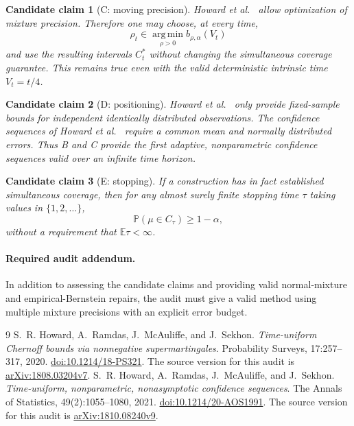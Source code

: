 \documentclass[11pt]{article}
\newtheorem{candidate}{Candidate claim}
\newcommand{\E}{\mathbb E}
\newcommand{\Prb}{\mathbb P}
\begin{document}
\begin{candidate}[C: moving precision]
Howard et al.~\cite{H2021} allow optimization of mixture precision. Therefore one may choose, at every time,
\begin{equation}\label{eq:moving-rho}
\rho_t\in\operatorname*{arg\,min}_{\rho>0}b_{\rho,\alpha}(V_t)
\end{equation}
and use the resulting intervals $C_t^*$ without changing the simultaneous coverage guarantee. This remains true even with the valid deterministic intrinsic time $V_t=t/4$.
\end{candidate}

\begin{candidate}[D: positioning]
Howard et al.~\cite{H2020} only provide fixed-sample bounds for independent identically distributed observations. The confidence sequences of Howard et al.~\cite{H2021} require a common mean and normally distributed errors. Thus B and C provide the first adaptive, nonparametric confidence sequences valid over an infinite time horizon.
\end{candidate}

\begin{candidate}[E: stopping]
If a construction has in fact established simultaneous coverage, then for any almost surely finite stopping time $\tau$ taking values in $\{1,2,\ldots\}$,
\begin{equation}\label{eq:stop}
\Prb(\mu\in C_\tau)\geq1-\alpha,
\end{equation}
without a requirement that $\E\tau<\infty$.
\end{candidate}

\paragraph{Required audit addendum.}
In addition to assessing the candidate claims and providing valid normal-mixture and empirical-Bernstein repairs, the audit must give a valid method using multiple mixture precisions with an explicit error budget.

\begin{thebibliography}{9}
S.~R. Howard, A.~Ramdas, J.~McAuliffe, and J.~Sekhon.
\emph{Time-uniform Chernoff bounds via nonnegative supermartingales}.
Probability Surveys, 17:257--317, 2020.
\href{https://doi.org/10.1214/18-PS321}{doi:10.1214/18-PS321}.
The source version for this audit is \href{https://arxiv.org/abs/1808.03204v7}{arXiv:1808.03204v7}.
S.~R. Howard, A.~Ramdas, J.~McAuliffe, and J.~Sekhon.
\emph{Time-uniform, nonparametric, nonasymptotic confidence sequences}.
The Annals of Statistics, 49(2):1055--1080, 2021.
\href{https://doi.org/10.1214/20-AOS1991}{doi:10.1214/20-AOS1991}.
The source version for this audit is \href{https://arxiv.org/abs/1810.08240v9}{arXiv:1810.08240v9}.
\end{thebibliography}
\end{document}

